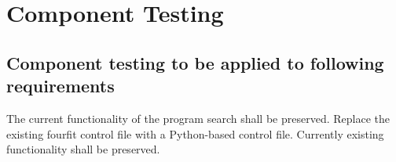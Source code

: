 %
%
\section{Component Testing}
\label{sec:component}


\subsection{Component testing to be applied to following requirements}
\label{sec:componentreqs}

\begin{description}
 The current functionality of the program \acs{search} shall be
  preserved.
 Replace the existing \acs{fourfit} control file with a
  \acs{Python}-based control file. Currently existing functionality shall be
  preserved.
\end{description}
%

%
%
